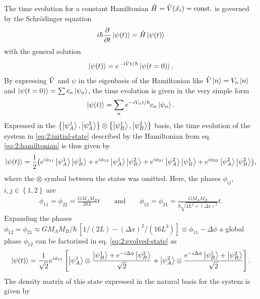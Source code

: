 The time evolution for a constant Hamiltonian $\hat{H} = \hat{V}(\hat{x_i}) = \mathrm{const.}$ is governed by the Schrödinger equation
\begin{equation}
  i\hbar \pdv{t}\ket{\psi(t)} = \hat{H} \ket{\psi(t)}
\end{equation}
with the general solution
\begin{equation}
  \ket{\psi(t)} = e^{-i \hat{V} t / \hbar} \ket{\psi(t=0)} .
\end{equation}
By expressing $\hat{V}$ and $\psi$ in the eigenbasis of the Hamiltonian like $\hat{V}\ket{n} = V_n \ket{n}$ and $\ket{\psi(t=0)} = \sum c_n \ket{\psi_n}$, the time evolution is given in the very simple form
\begin{equation}
  \ket{\psi(t)} = \sum_n e^{-i V_n t /\hbar} c_n \ket{\psi_n} .
\end{equation}
Expressed in the $\left\{ \ket{\psi_A^1}, \ket{\psi_A^2} \right\}\otimes \left\{ \ket{\psi_B^1}, \ket{\psi_B^2} \right\}$ basis, the time evolution of the system in \eqref{eq:2:initial-state} described by the Hamiltonian from eq. \eqref{eq:2:hamiltonian} is thus given by
\begin{equation}\label{eq:2:evolved-state}
  \ket{\psi(t)} = \frac{1}{2}\bigl(
    e^{i\phi_{11}} \ket{\psi_A^1}\ket{\psi_B^1} 
    + e^{i\phi_{12}} \ket{\psi_A^1}\ket{\psi_B^2}
    + e^{i\phi_{21}} \ket{\psi_A^2}\ket{\psi_B^1} 
    + e^{i\phi_{22}} \ket{\psi_A^2}\ket{\psi_B^2} \bigr) ,
\end{equation}
where the $\otimes$ symbol between the states was omitted.
Here, the phases $\phi_{ij}$, $i,j \in \left\{1,2\right\}$ are
\begin{align}
  \phi_{11}=\phi_{22} = \frac{G M_A M_B}{2\hbar L}t 
  \qquad \text{and} \qquad 
  \phi_{12}=\phi_{21} = \frac{G M_A M_B}{\hbar \sqrt{4L^2 + (\Delta x)^2}}t.
\end{align}
Expanding the phases $\phi_{12} = \phi_{21} \approx G M_A M_B/\hbar \, \left[ 1/(2L) - (\Delta x)^2/(16L^3) \right] \equiv \phi_{11} - \Delta \phi$ a global phase $\phi_{12}$ can be factorized in eq. \eqref{eq:2:evolved-state} as
\begin{equation}
  \ket{\psi(t)} = \frac{1}{\sqrt{2}}e^{i\phi_{11}}\left[ 
    \ket{\psi_A^1} \otimes \frac{\ket{\psi_B^1} + e^{-i\Delta\phi} \ket{\psi_B^2}}{\sqrt{2}}
    + \ket{\psi_A^2} \otimes \frac{e^{-i\Delta\phi} \ket{\psi_B^1} + \ket{\psi_B^2}}{\sqrt{2}} \right] .
\end{equation}
The density matrix of this state expressed in the natural basis for the system is given by
